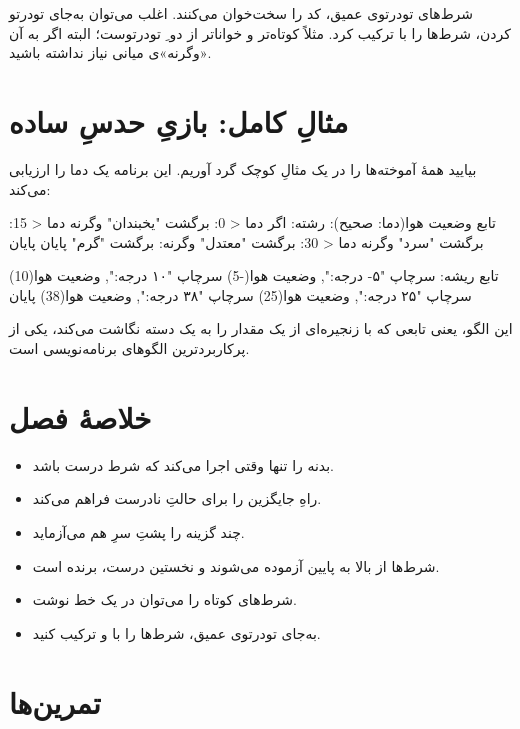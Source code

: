 \begin{tip}
شرط‌های تودرتوی عمیق، کد را سخت‌خوان می‌کنند. اغلب می‌توان به‌جای تودرتو کردن،
شرط‌ها را با  ترکیب کرد. مثلاً
 کوتاه‌تر و خواناتر از دو ِ تودرتوست؛
البته اگر به آن «وگرنه»ی میانی نیاز نداشته باشید.
\end{tip}

\section{مثالِ کامل: بازیِ حدسِ ساده}

بیایید همهٔ آموخته‌ها را در یک مثالِ کوچک گرد آوریم. این برنامه یک دما را
ارزیابی می‌کند:

\begin{salamfa}
تابع وضعیت هوا(دما: صحیح): رشته:
    اگر دما < 0:
        برگشت "یخبندان"
    وگرنه دما < 15:
        برگشت "سرد"
    وگرنه دما < 30:
        برگشت "معتدل"
    وگرنه:
        برگشت "گرم"
    پایان
پایان

تابع ریشه:
    سرچاپ "۵- درجه:", وضعیت هوا(-5)
    سرچاپ "۱۰ درجه:", وضعیت هوا(10)
    سرچاپ "۲۵ درجه:", وضعیت هوا(25)
    سرچاپ "۳۸ درجه:", وضعیت هوا(38)
پایان
\end{salamfa}

این الگو، یعنی تابعی که با زنجیره‌ای از  یک مقدار را به یک
دسته نگاشت می‌کند، یکی از پرکاربردترین الگوهای برنامه‌نویسی است.

\section{خلاصهٔ فصل}

\begin{itemize}
  \item {} بدنه را تنها وقتی اجرا می‌کند که شرط درست باشد.
  \item {} راهِ جایگزین را برای حالتِ نادرست فراهم می‌کند.
  \item {} چند گزینه را پشتِ سرِ هم می‌آزماید.
  \item شرط‌ها از بالا به پایین آزموده می‌شوند و نخستین درست، برنده است.
  \item شرط‌های کوتاه را می‌توان در یک خط نوشت.
  \item به‌جای تودرتوی عمیق، شرط‌ها را با  و  ترکیب کنید.
\end{itemize}

\section{تمرین‌ها}

